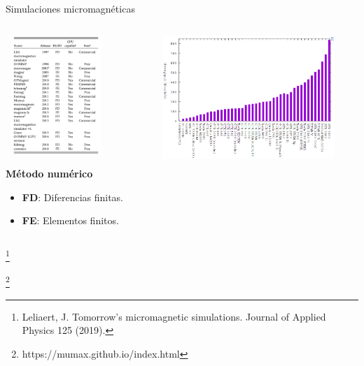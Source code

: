 \documentclass{beamer}
\newcommand\blfootnote[1]{%
  \begingroup
  \renewcommand\thefootnote{}\footnote{#1}%
  \addtocounter{footnote}{-1}%
  \endgroup
}
\begin{document}
\begin{frame}{Simulaciones micromagnéticas}
    \begin{columns}
    \begin{column}{0.5\textwidth}
        \begin{center} 
            \includegraphics[width=3.8cm,height=4.5cm]{pic/Paquetes.png}
        \end{center}
        \scriptsize
    \textbf{Método numérico}
    \begin{itemize}
        \item \textbf{FD}: Diferencias finitas.
        \item \textbf{FE}: Elementos finitos.
    \end{itemize}
    
    \end{column}
    \begin{column}{0.5\textwidth}
    \centering
    \includegraphics[width=6.5cm,height=4.7cm,angle=90]{pic/GPUs.png}
    \end{column}
    \end{columns}
    \blfootnote{ {\tiny Leliaert, J. Tomorrow's micromagnetic simulations. Journal of Applied Physics 125 (2019). }}
    \blfootnote{ {\tiny https://mumax.github.io/index.html}}
\end{frame}
\end{document}
